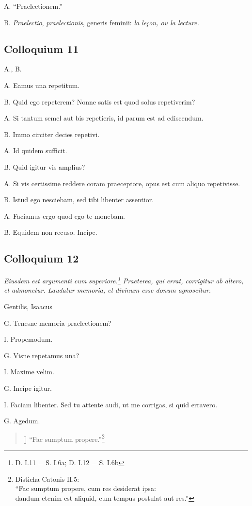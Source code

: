 \documentclass{article}
\newcommand{\fr}[1]{\foreignlanguage{french}{\emph{#1}}}
\begin{document}
A. ``Praelectionem.''

B. \emph{Praelectio}, \emph{praelectionis}, generis feminii: \fr{la leçon, ou la lecture.}
\subsection{Colloquium 11}
A., B.

A. Eamus una repetitum.

B. Quid ego repeterem? Nonne satis est quod solus repetiverim?

A. Si tantum semel aut bis repetieris, id parum est ad ediscendum.

B. Immo circiter decies repetivi.

A. Id quidem sufficit.

B. Quid igitur vis amplius?

A. Si vis certissime reddere coram praeceptore, opus est cum aliquo repetivisse.

B. Istud ego nesciebam, sed tibi libenter assentior.

A. Faciamus ergo quod ego te monebam.

B. Equidem non recuso. Incipe.

\subsection{Colloquium 12}
\emph{Eiusdem est argumenti cum superiore.\footnote{D. I.11 = S. I.6a; D. I.12 = S. I.6b} Praeterea, qui errat, corrigitur ab altero, et admonetur. Laudatur memoria, et divinum esse donum agnoscitur.}

Gentilis, Isaacus

G. Tenesne memoria praelectionem?

I. Propemodum.

G. Visne repetamus una?

I. Maxime velim.

G. Incipe igitur.

I. Faciam libenter. Sed tu attente audi, ut me corrigas, si quid erravero.

G. Agedum.

\begin{verse}[\versewidth] ``Fac sumptum propere.''\footnote{Disticha Catonis II.5:\\``Fac sumptum propere, cum res desiderat ipsa:\\dandum etenim est aliquid, cum tempus postulat aut res.''}\end{verse}
\end{document}
